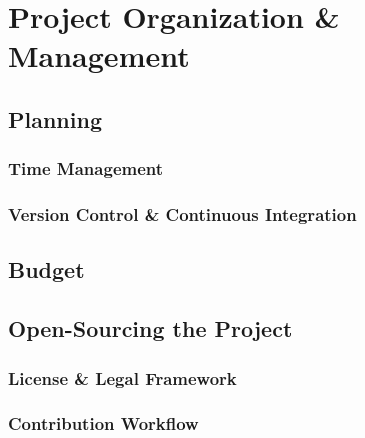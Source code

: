 \section{Project Organization \& Management}

\subsection{Planning}

\subsubsection{Time Management}
\subsubsection{Version Control \& Continuous Integration}

\subsection{Budget}

\subsection{Open-Sourcing the Project}

\subsubsection{License \& Legal Framework}
\subsubsection{Contribution Workflow}

\newpage

